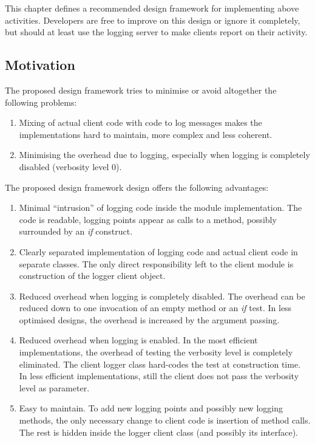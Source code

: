 \documentclass[a4paper,twoside]{tce}
\begin{document}
This chapter defines a recommended design framework for implementing above
activities. Developers are free to improve on this design or ignore it
completely, but should at least use the logging server to make clients
report on their activity.

\subsection{Motivation}

The proposed design framework tries to minimise or avoid altogether the
following problems:
\begin{enumerate}
\item %
  Mixing of actual client code with code to log messages makes the
  implementations hard to maintain, more complex and less coherent.
\item %
  Minimising the overhead due to logging, especially when logging is
  completely disabled (verbosity level 0).
\end{enumerate}

The proposed design framework design offers the following advantages:
\begin{enumerate}
\item %
  Minimal ``intrusion'' of logging code inside the module implementation.
  The code is readable, logging points appear as calls to a method, possibly
  surrounded by an \emph{if} construct.
\item %
  Clearly separated implementation of logging code and actual client code in
  separate classes. The only direct responsibility left to the client module
  is construction of the logger client object.
\item %
  Reduced overhead when logging is completely disabled. The overhead can be
  reduced down to one invocation of an empty method or an \emph{if} test. In
  less optimised designs, the overhead is increased by the argument passing.
\item %
  Reduced overhead when logging is enabled. In the most efficient
  implementations, the overhead of testing the verbosity level is completely
  eliminated. The client logger class hard-codes the test at construction
  time. In less efficient implementations, still the client does not pass
  the verbosity level as parameter.
\item %
  Easy to maintain. To add new logging points and possibly new logging
  methods, the only necessary change to client code is insertion of method
  calls. The rest is hidden inside the logger client class (and possibly its
  interface).
\end{enumerate}
\end{document}
